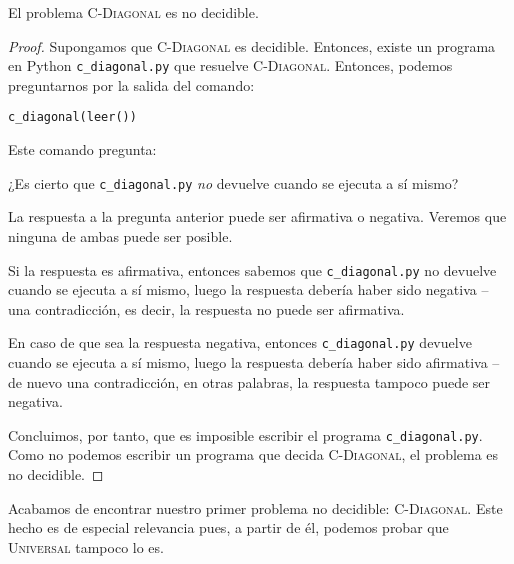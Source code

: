 \begin{proposicion}\label{prop:c-diagonal-no-decidible}
El problema \textsc{C-Diagonal} es no decidible.
\end{proposicion}
\begin{proof}
Supongamos que \textsc{C-Diagonal} es decidible. Entonces, existe un programa en Python \texttt{c\_diagonal.py} que resuelve \textsc{C-Diagonal}. Entonces, podemos preguntarnos por la salida del comando:
\begin{adjustwidth}{30pt}{}
    \texttt{c\_diagonal(\texttt{leer}())}
\end{adjustwidth}
Este comando pregunta:
\begin{adjustwidth}{30pt}{}
    ¿Es cierto que \texttt{c\_diagonal.py} \emph{no} devuelve  cuando se ejecuta a sí mismo?
\end{adjustwidth}
La respuesta a la pregunta anterior puede ser afirmativa o negativa. Veremos que ninguna de ambas puede ser posible.

Si la respuesta es afirmativa, entonces sabemos que \texttt{c\_diagonal.py} no devuelve  cuando se ejecuta a sí mismo, luego la respuesta debería haber sido negativa -- una contradicción, es decir, la respuesta no puede ser afirmativa.

En caso de que sea la respuesta negativa, entonces \texttt{c\_diagonal.py} devuelve  cuando se ejecuta a sí mismo, luego la respuesta debería haber sido afirmativa -- de nuevo una contradicción, en otras palabras, la respuesta tampoco puede ser negativa.

Concluimos, por tanto, que es imposible escribir el programa \texttt{c\_diagonal.py}. Como no podemos escribir un programa que decida \textsc{C-Diagonal}, el problema es no decidible.
\end{proof}

Acabamos de encontrar nuestro primer problema no decidible: \textsc{C-Diagonal}. Este hecho es de especial relevancia pues, a partir de él, podemos probar que \textsc{Universal} tampoco lo es.

